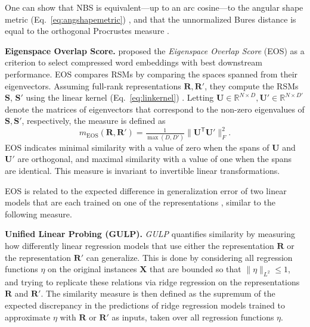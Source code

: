 \documentclass{article}
\newcommand{\citet}{\textcite}
\newcommand{\Real}{\mathbb{R}}
\newcommand{\R}{\bm{R}}
\newcommand{\Rp}{\bm{R'}}
\newcommand{\Sm}{\bm{S}}
\newcommand{\Smp}{\bm{S'}}
\newcommand{\transp}{\mathsf{T}}
\newcommand\myeqref[1]{%
    (\textup{Eq.~\ref{#1}})%
}
\newcommand{\subheader}{\textbf}
\begin{document}
One can show that NBS is equivalent---up to an arc cosine---to the angular shape metric \myeqref{eq:angshapemetric}, and that the unnormalized Bures distance is equal to the orthogonal Procrustes measure \cite{harvey_duality_2024}.


\subheader{Eigenspace Overlap Score.}
\citet{may_downstream_2020} proposed the \emph{Eigenspace Overlap Score} (EOS) as a criterion to select compressed word embeddings with best downstream performance.
EOS compares RSMs by comparing the spaces spanned from their eigenvectors.
Assuming full-rank representations $\R,\Rp$, they compute the RSMs $\Sm$, $\Smp$ using the linear kernel \myeqref{eq:linkernel}.
Letting $\bm{U}\in\Real^{N\times D},\bm{U'}\in \Real^{N\times D'}$ denote the matrices of eigenvectors that correspond to the non-zero eigenvalues of $\Sm,\Smp$, respectively, the measure is defined as
\begin{equation}\label{eq:eos}
    m_{\text{EOS}}(\R,\Rp)=\tfrac{1}{\max(D, D')}\|\bm{U}^\transp \bm{U'}\|_F^2.
\end{equation}
EOS indicates minimal similarity with a value of zero when the spans of $\bm{U}$ and $\bm{U'}$ are orthogonal, and maximal similarity with a value of one when the spans are identical.
This measure is invariant to invertible linear transformations.


EOS is related to the expected difference in generalization error of two linear models that are each trained on one of the representations \cite{may_downstream_2020}, similar to the following measure.


\subheader{Unified Linear Probing (GULP).}\label{sssec:gulp}
\emph{GULP} quantifies similarity by measuring how differently linear regression models that use either the representation $\R$ or the representation $\Rp$ \cite{boix-adsera_gulp_2022} can generalize.
This is done by considering all regression functions $\eta$ on the original instances $\bm{X}$ that are bounded so that $\|\eta\|_{L^2} \leq 1$, and trying to replicate these relations via ridge regression on the representations $\R$ and $\Rp$.
The similarity measure is then defined as the supremum of the expected discrepancy in the predictions of ridge regression models trained to approximate $\eta$ with $\R$ or $\Rp$ as inputs, taken over all regression functions $\eta$.
\end{document}
